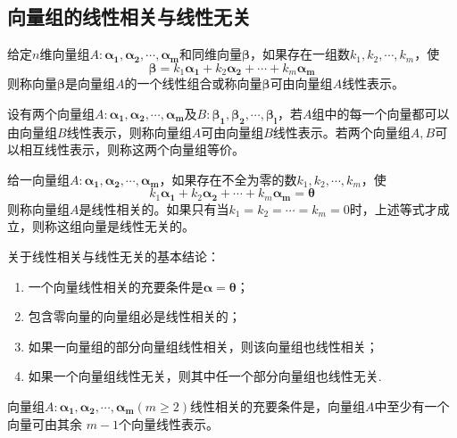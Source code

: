 \subsection{向量组的线性相关与线性无关}
\begin{definition}
    给定$n$维向量组$A:\boldsymbol{\alpha_1},\boldsymbol{\alpha_2},\cdots,\boldsymbol{\alpha_m}$和同维向量$\boldsymbol{\beta}$，如果存在一组数$k_1,k_2,\cdots,k_m$，使
    $$\boldsymbol{\beta}=k_1\boldsymbol{\alpha_1}+k_2\boldsymbol{\alpha_2}+\cdots+k_m\boldsymbol{\alpha_m}$$
    则称向量$\boldsymbol{\beta}$是向量组$A$的一个线性组合或称向量$\boldsymbol{\beta}$可由向量组$A$线性表示。
\end{definition}

\begin{definition}[等价向量组]
    设有两个向量组$A:\boldsymbol{\alpha_1},\boldsymbol{\alpha_2},\cdots,\boldsymbol{\alpha_m}$及$B:\boldsymbol{\beta_1},\boldsymbol{\beta_2},\cdots,\boldsymbol{\beta_l}$，若$A$组中的每一个向量都可以
    由向量组$B$线性表示，则称向量组$A$可由向量组$B$线性表示。若两个向量组$A,B$可以相互线性表示，则称这两个{\heiti 向量组等价}。
\end{definition}

\begin{definition}[线性相关与线性无关]
    给一向量组$A:\boldsymbol{\alpha_1},\boldsymbol{\alpha_2},\cdots,\boldsymbol{\alpha_m}$，如果存在不全为零的数$k_1,k_2,\cdots,k_m$，使
    $$k_1\boldsymbol{\alpha_1}+k_2\boldsymbol{\alpha_2}+\cdots+k_m\boldsymbol{\alpha_m}=\boldsymbol{\theta}$$
    则称向量组$A$是{\heiti 线性相关}的。如果只有当$k_1=k_2=\cdots=k_m=0$时，上述等式才成立，则称这组向量是{\heiti 线性无关}的。
\end{definition}

\begin{theorem}
    关于线性相关与线性无关的基本结论：
    \begin{enumerate}[(1)]
        \item 一个向量线性相关的充要条件是$\boldsymbol{\alpha}=\boldsymbol{\theta}$；
        \item 包含零向量的向量组必是线性相关的；
        \item 如果一向量组的部分向量组线性相关，则该向量组也线性相关；
        \item 如果一个向量组线性无关，则其中任一个部分向量组也线性无关.
    \end{enumerate}
\end{theorem}

\begin{theorem}
    向量组$A:\boldsymbol{\alpha_1},\boldsymbol{\alpha_2},\cdots,\boldsymbol{\alpha_m}(m\geq 2)$线性相关的充要条件是，向量组$A$中至少有一个向量可由其余
    $m-1$个向量线性表示。
\end{theorem}

